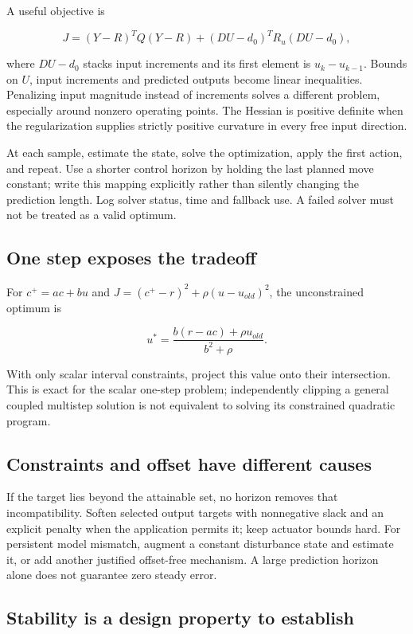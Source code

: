 \documentclass[11pt,a4paper]{article}
\begin{document}
A useful objective is


\[J=(Y-R)^TQ(Y-R)+(DU-d_0)^TR_u(DU-d_0),\]

where $DU-d_0$ stacks input increments and its first element is $u_k-u_{k-1}$. Bounds on $U$, input increments and predicted outputs become linear inequalities. Penalizing input magnitude instead of increments solves a different problem, especially around nonzero operating points. The Hessian is positive definite when the regularization supplies strictly positive curvature in every free input direction.


At each sample, estimate the state, solve the optimization, apply the first action, and repeat. Use a shorter control horizon by holding the last planned move constant; write this mapping explicitly rather than silently changing the prediction length. Log solver status, time and fallback use. A failed solver must not be treated as a valid optimum.


\subsection{One step exposes the tradeoff}

For $c^+=ac+bu$ and $J=(c^+-r)^2+\rho(u-u_{old})^2$, the unconstrained optimum is


\[u^*=\frac{b(r-ac)+\rho u_{old}}{b^2+\rho}.\]

With only scalar interval constraints, project this value onto their intersection. This is exact for the scalar one-step problem; independently clipping a general coupled multistep solution is not equivalent to solving its constrained quadratic program.


\subsection{Constraints and offset have different causes}

If the target lies beyond the attainable set, no horizon removes that incompatibility. Soften selected output targets with nonnegative slack and an explicit penalty when the application permits it; keep actuator bounds hard. For persistent model mismatch, augment a constant disturbance state and estimate it, or add another justified offset-free mechanism. A large prediction horizon alone does not guarantee zero steady error.


\subsection{Stability is a design property to establish}
\end{document}
